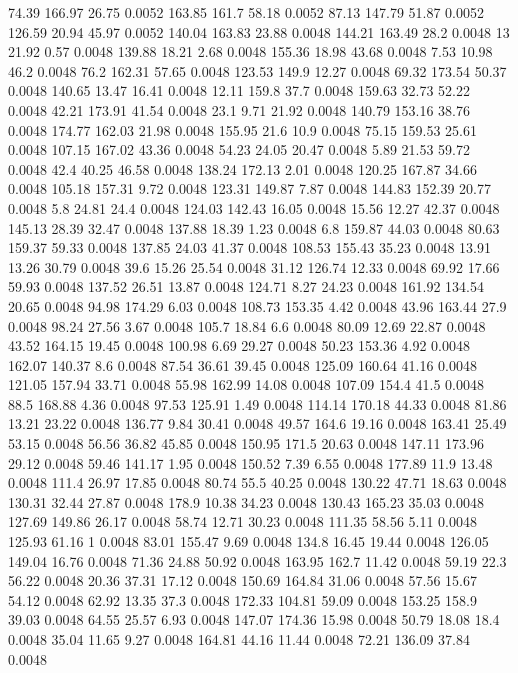74.39	166.97	26.75	0.0052
163.85	161.7	58.18	0.0052
87.13	147.79	51.87	0.0052
126.59	20.94	45.97	0.0052
140.04	163.83	23.88	0.0048
144.21	163.49	28.2	0.0048
13	21.92	0.57	0.0048
139.88	18.21	2.68	0.0048
155.36	18.98	43.68	0.0048
7.53	10.98	46.2	0.0048
76.2	162.31	57.65	0.0048
123.53	149.9	12.27	0.0048
69.32	173.54	50.37	0.0048
140.65	13.47	16.41	0.0048
12.11	159.8	37.7	0.0048
159.63	32.73	52.22	0.0048
42.21	173.91	41.54	0.0048
23.1	9.71	21.92	0.0048
140.79	153.16	38.76	0.0048
174.77	162.03	21.98	0.0048
155.95	21.6	10.9	0.0048
75.15	159.53	25.61	0.0048
107.15	167.02	43.36	0.0048
54.23	24.05	20.47	0.0048
5.89	21.53	59.72	0.0048
42.4	40.25	46.58	0.0048
138.24	172.13	2.01	0.0048
120.25	167.87	34.66	0.0048
105.18	157.31	9.72	0.0048
123.31	149.87	7.87	0.0048
144.83	152.39	20.77	0.0048
5.8	24.81	24.4	0.0048
124.03	142.43	16.05	0.0048
15.56	12.27	42.37	0.0048
145.13	28.39	32.47	0.0048
137.88	18.39	1.23	0.0048
6.8	159.87	44.03	0.0048
80.63	159.37	59.33	0.0048
137.85	24.03	41.37	0.0048
108.53	155.43	35.23	0.0048
13.91	13.26	30.79	0.0048
39.6	15.26	25.54	0.0048
31.12	126.74	12.33	0.0048
69.92	17.66	59.93	0.0048
137.52	26.51	13.87	0.0048
124.71	8.27	24.23	0.0048
161.92	134.54	20.65	0.0048
94.98	174.29	6.03	0.0048
108.73	153.35	4.42	0.0048
43.96	163.44	27.9	0.0048
98.24	27.56	3.67	0.0048
105.7	18.84	6.6	0.0048
80.09	12.69	22.87	0.0048
43.52	164.15	19.45	0.0048
100.98	6.69	29.27	0.0048
50.23	153.36	4.92	0.0048
162.07	140.37	8.6	0.0048
87.54	36.61	39.45	0.0048
125.09	160.64	41.16	0.0048
121.05	157.94	33.71	0.0048
55.98	162.99	14.08	0.0048
107.09	154.4	41.5	0.0048
88.5	168.88	4.36	0.0048
97.53	125.91	1.49	0.0048
114.14	170.18	44.33	0.0048
81.86	13.21	23.22	0.0048
136.77	9.84	30.41	0.0048
49.57	164.6	19.16	0.0048
163.41	25.49	53.15	0.0048
56.56	36.82	45.85	0.0048
150.95	171.5	20.63	0.0048
147.11	173.96	29.12	0.0048
59.46	141.17	1.95	0.0048
150.52	7.39	6.55	0.0048
177.89	11.9	13.48	0.0048
111.4	26.97	17.85	0.0048
80.74	55.5	40.25	0.0048
130.22	47.71	18.63	0.0048
130.31	32.44	27.87	0.0048
178.9	10.38	34.23	0.0048
130.43	165.23	35.03	0.0048
127.69	149.86	26.17	0.0048
58.74	12.71	30.23	0.0048
111.35	58.56	5.11	0.0048
125.93	61.16	1	0.0048
83.01	155.47	9.69	0.0048
134.8	16.45	19.44	0.0048
126.05	149.04	16.76	0.0048
71.36	24.88	50.92	0.0048
163.95	162.7	11.42	0.0048
59.19	22.3	56.22	0.0048
20.36	37.31	17.12	0.0048
150.69	164.84	31.06	0.0048
57.56	15.67	54.12	0.0048
62.92	13.35	37.3	0.0048
172.33	104.81	59.09	0.0048
153.25	158.9	39.03	0.0048
64.55	25.57	6.93	0.0048
147.07	174.36	15.98	0.0048
50.79	18.08	18.4	0.0048
35.04	11.65	9.27	0.0048
164.81	44.16	11.44	0.0048
72.21	136.09	37.84	0.0048
